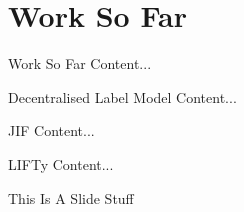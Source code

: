 \section{Work So Far}

\begin{frame}{Work So Far}
	Content...
\end{frame}

\begin{frame}{Decentralised Label Model}
	Content...
\end{frame}

\begin{frame}{JIF}
	Content...
\end{frame}

\begin{frame}{LIFTy}
	Content...
\end{frame}

\begin{frame}{This Is A Slide}
	Stuff
\end{frame}